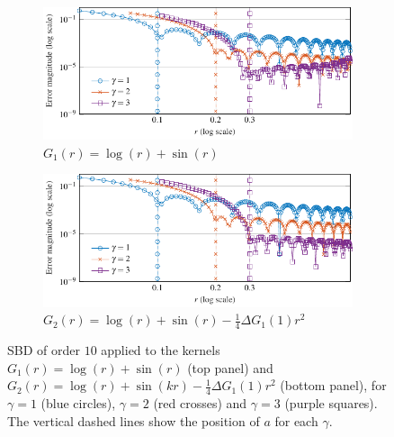 \documentclass[smallextended]{svjour3}
\begin{document}
\begin{figure}[ht]	
	\centering
	\setlength{\plotwidth}{\textwidth}
	\begin{subfigure}[b]{\plotwidth}
		\centering
		\includegraphics[scale = 1]{ArbitraryKernBadSit}
		\caption{$G_1(r) = \log(r) + \sin(r)$}
	\end{subfigure}
	\vspace{5.0pt}
	
	\begin{subfigure}[b]{\plotwidth}
		\centering
		\includegraphics[scale = 1]{ArbitraryKernGoodSit}
		\caption{$G_2(r) = \log(r) + \sin(r) - \frac{1}{4}\Delta G_1(1)r^2$}		
	\end{subfigure}
	\caption{SBD of order $10$ applied to the kernels $G_1(r) = \log(r) + \sin(r)$ (top panel) and $G_2(r) = \log(r) + \sin(kr) - \frac{1}{4}\Delta G_1(1)r^2$ (bottom panel), for $\gamma = 1$ (blue circles), $\gamma = 2$ (red crosses) and $\gamma = 3$ (purple squares). The vertical dashed lines show the position of $a$ for each $\gamma$.}
	\label{fig:badSit}
\end{figure}

			
\end{document}
